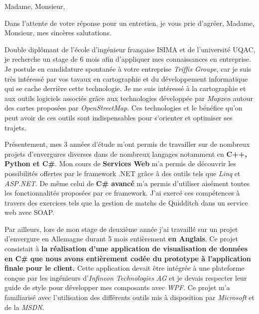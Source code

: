 \date{\today}
\opening{Madame, Monsieur,}
\closing{Dans l'attente de votre réponse pour un entretien, je vous prie d'agréer, Madame, Monsieur, mes sincères salutations.}

\makelettertitle

\introduction{}
Double diplômant de l'école d'ingénieur française ISIMA et de l'université UQAC, je recherche un stage de 6 mois afin d'appliquer mes connaissances en entreprise. Je postule en candidature spontanée à votre entreprise \textit{Triffis Groupe}, car je suis très intéressé par vos tavaux en cartographie et du développement informatique qui se cache derrière cette technologie. Je me suis intéressé à la cartographie et aux outils logiciels associés grâce aux technologies développée par \textit{Mapzen} autour des cartes proposées par \textit{OpenStreetMap}. Ces technologies et le bénéfice qu'on peut avoir de ces outils sont indispensables pour s'orienter et optimiser ses trajets.

Présentement, mes 3 années d'étude m'ont permis de travailler sur de nombreux projets d'envergures diverses dans de nombreux langages notamment en \textbf{C++, Python et C\#}. Mon cours de \textbf{Services Web} m'a permis de découvrir les possibilités offertes par le framework .NET grâce à des outils tels que \textit{Linq} et \textit{ASP.NET}.  De même celui de \textbf{C\# avancé} m’a permis d'utiliser aisément toutes les fonctionnalités proposées par ce framework. J'ai exercé ces compétences à travers des exercices tels que la gestion de matchs de Quidditch dans un service web avec SOAP.

Par ailleurs, lors de mon stage de deuxième année j'ai travaillé sur un projet d'envergure en Allemagne durant 5 mois entièrement \textbf{en Anglais}. Ce projet consistait à \textbf{la réalisation d'une application de visualisation de données en C\# que nous avons entièrement codée du prototype à l'application finale pour le client.} Cette application devait être intégrée à une plateforme conçue par les ingénieurs d'\textit{Infineon Technologies AG} et je devais respecter leur guide de style pour développer mes composants avec \textit{WPF}. Ce projet m'a familiarisé avec l'utilisation des différents outils mis à disposition par \textit{Microsoft} et de la \textit{MSDN}.

